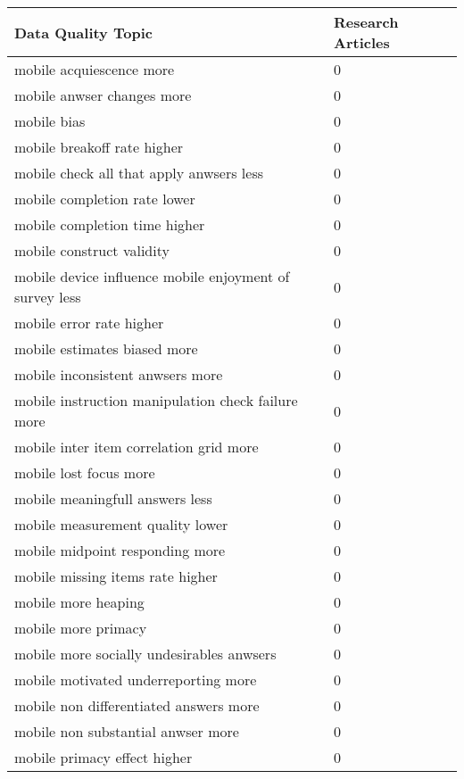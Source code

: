 \begin{table}
	\centering
	\begin{tabular}{ll}
		\toprule
		Data Quality Topic  &  Research Articles \\
		\midrule
        mobile acquiescence more    & 0  \\
        mobile anwser changes more    & 0  \\
        mobile bias   & 0  \\
        mobile breakoff rate higher    & 0  \\
        mobile check all that apply anwsers less    & 0  \\
        mobile completion rate lower    & 0  \\
        mobile completion time higher    & 0  \\
        mobile construct validity    & 0  \\
        mobile device influence
        mobile enjoyment of survey less    & 0  \\
        mobile error rate higher    & 0  \\
        mobile estimates biased more    & 0  \\
        mobile inconsistent anwsers more    & 0  \\
        mobile instruction manipulation check failure more    & 0  \\
        mobile inter item correlation grid more    & 0  \\
        mobile lost focus more    & 0  \\
        mobile meaningfull answers less    & 0  \\
        mobile measurement quality lower    & 0  \\
        mobile midpoint responding more    & 0  \\
        mobile missing items rate higher    & 0  \\
        mobile more heaping    & 0  \\
        mobile more primacy    & 0  \\
        mobile more socially undesirables anwsers    & 0  \\
        mobile motivated underreporting more    & 0  \\
        mobile non differentiated answers more    & 0  \\
        mobile non substantial anwser more    & 0  \\
        mobile primacy effect higher    & 0  \\

\end{tabular}
\end{table}
